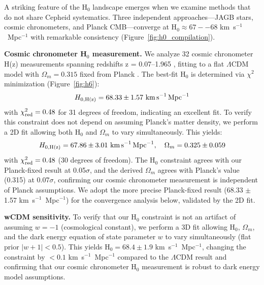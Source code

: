 \documentclass[preprint, linenumbers]{aastex701}
\begin{document}
A striking feature of the H$_0$ landscape emerges when we examine methods that do not share Cepheid systematics. Three independent approaches---JAGB stars, cosmic chronometers, and Planck CMB---converge at H$_0 \approx 67--68$ km~s$^{-1}$~Mpc$^{-1}$ with remarkable consistency (Figure~\ref{fig:h0_compilation}).

\textbf{Cosmic chronometer H$_0$ measurement.} We analyze 32 cosmic chronometer H(z) measurements spanning redshifts z = 0.07--1.965 \citep{Moresco2022}, fitting to a flat $\Lambda$CDM model with $\Omega_m = 0.315$ fixed from Planck \citep{Planck2018}. The best-fit H$_0$ is determined via $\chi^2$ minimization (Figure~\ref{fig:h6}):
\begin{equation}
H_{0,\rm H(z)} = 68.33 \pm 1.57~\mathrm{km\,s}^{-1}\,\mathrm{Mpc}^{-1}
\end{equation}
with $\chi^2_{\rm red} = 0.48$ for 31 degrees of freedom, indicating an excellent fit. To verify this constraint does not depend on assuming Planck's matter density, we perform a 2D fit allowing both H$_0$ and $\Omega_m$ to vary simultaneously. This yields:
\begin{equation}
H_{0,\rm H(z)} = 67.86 \pm 3.01~\mathrm{km\,s}^{-1}\,\mathrm{Mpc}^{-1}, \quad \Omega_m = 0.325 \pm 0.059
\end{equation}
with $\chi^2_{\rm red} = 0.48$ (30 degrees of freedom). The H$_0$ constraint agrees with our Planck-fixed result at 0.05$\sigma$, and the derived $\Omega_m$ agrees with Planck's value (0.315) at 0.07$\sigma$, confirming our cosmic chronometer measurement is independent of Planck assumptions. We adopt the more precise Planck-fixed result (68.33 $\pm$ 1.57 km~s$^{-1}$~Mpc$^{-1}$) for the convergence analysis below, validated by the 2D fit.

\textbf{wCDM sensitivity.} To verify that our H$_0$ constraint is not an artifact of assuming $w = -1$ (cosmological constant), we perform a 3D fit allowing H$_0$, $\Omega_m$, and the dark energy equation of state parameter $w$ to vary simultaneously (flat prior $|w+1| < 0.5$). This yields H$_0 = 68.4 \pm 1.9$ km~s$^{-1}$~Mpc$^{-1}$, changing the constraint by $<0.1$ km~s$^{-1}$~Mpc$^{-1}$ compared to the $\Lambda$CDM result and confirming that our cosmic chronometer H$_0$ measurement is robust to dark energy model assumptions.
\end{document}
